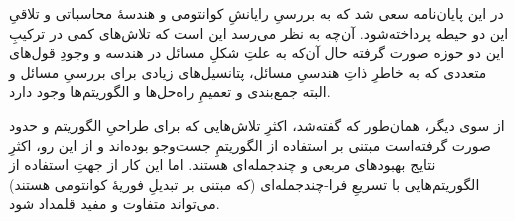 

در این پایان‌نامه سعی شد که به بررسیِ رایانشِ کوانتومی و هندسهٔ محاسباتی و تلاقیِ این دو حیطه پرداخته‌شود. آن‌چه به نظر می‌رسد این است که تلاش‌های کمی در ترکیبِ این دو حوزه صورت گرفته حال آن‌که به علتِ شکلِ مسائل در هندسه و وجودِ قول‌های متعددی که به خاطرِ ذاتِ هندسیِ مسائل، پتانسیل‌های زیادی برای بررسیِ مسائل و البته جمع‌بندی و تعمیمِ راه‌حل‌ها و الگوریتم‌ها وجود دارد.

از سوی دیگر، همان‌طور که گفته‌شد، اکثرِ تلاش‌هایی که برای طراحیِ الگوریتم و حدود صورت گرفته‌است مبتنی بر استفاده از الگوریتمِ جست‌وجو بوده‌اند و از این رو، اکثرِ نتایج بهبودهای مربعی و چندجمله‌ای هستند. اما این کار از جهتِ استفاده از الگوریتم‌هایی با تسریعِ فرا-چندجمله‌ای (که مبتنی بر تبدیلِ فوریهٔ کوانتومی هستند) می‌تواند متفاوت و مفید قلمداد شود.

